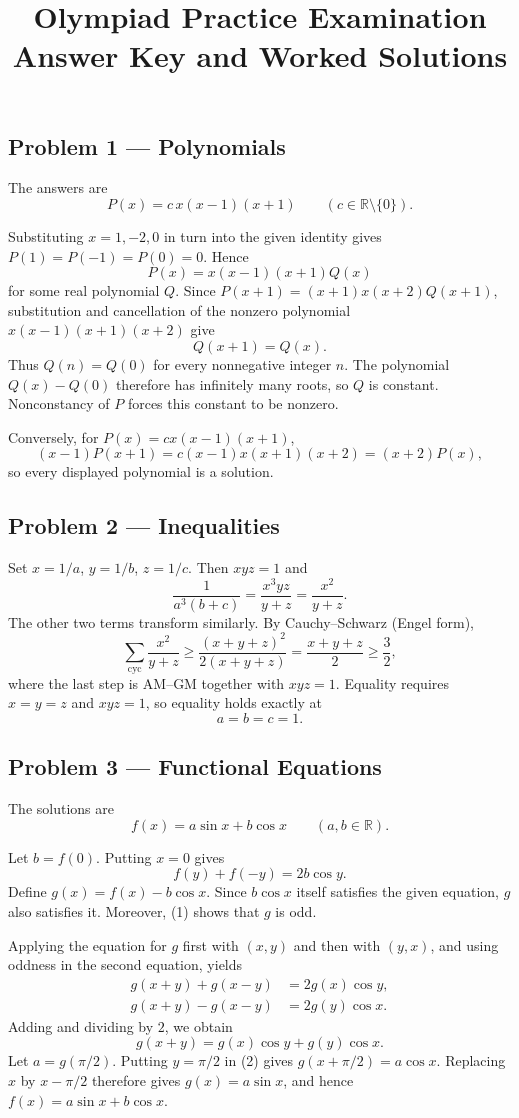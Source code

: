 \documentclass[11pt,a4paper]{article}
\title{\vspace{-1.5cm}\bfseries Olympiad Practice Examination\\Answer Key and Worked Solutions}
\author{}
\date{}
\newcommand{\RR}{\mathbb{R}}
\newcommand{\solution}[2]{\subsection*{Problem #1 --- #2}}
\begin{document}
\maketitle
\vspace{-2em}

\solution{1}{Polynomials}
The answers are
\[
  \boxed{P(x)=c\,x(x-1)(x+1)\qquad(c\in\RR\setminus\{0\}).}
\]

Substituting $x=1,-2,0$ in turn into the given identity gives
$P(1)=P(-1)=P(0)=0$. Hence
\[
  P(x)=x(x-1)(x+1)Q(x)
\]
for some real polynomial $Q$. Since
$P(x+1)=(x+1)x(x+2)Q(x+1)$, substitution and cancellation of the nonzero
polynomial $x(x-1)(x+1)(x+2)$ give
\[
  Q(x+1)=Q(x).
\]
Thus $Q(n)=Q(0)$ for every nonnegative integer $n$. The polynomial
$Q(x)-Q(0)$ therefore has infinitely many roots, so $Q$ is constant.
Nonconstancy of $P$ forces this constant to be nonzero.

Conversely, for $P(x)=c x(x-1)(x+1)$,
\[
  (x-1)P(x+1)=c(x-1)x(x+1)(x+2)=(x+2)P(x),
\]
so every displayed polynomial is a solution.

\solution{2}{Inequalities}
Set $x=1/a$, $y=1/b$, $z=1/c$. Then $xyz=1$ and
\[
  \frac1{a^3(b+c)}
  =\frac{x^3yz}{y+z}
  =\frac{x^2}{y+z}.
\]
The other two terms transform similarly. By Cauchy--Schwarz (Engel form),
\[
  \sum_{\mathrm{cyc}}\frac{x^2}{y+z}
  \ge \frac{(x+y+z)^2}{2(x+y+z)}
  =\frac{x+y+z}{2}
  \ge\frac32,
\]
where the last step is AM--GM together with $xyz=1$. Equality requires
$x=y=z$ and $xyz=1$, so equality holds exactly at
\[
  \boxed{a=b=c=1}.
\]

\solution{3}{Functional Equations}
The solutions are
\[
  \boxed{f(x)=a\sin x+b\cos x\qquad(a,b\in\RR).}
\]

Let $b=f(0)$. Putting $x=0$ gives
\[
  f(y)+f(-y)=2b\cos y. \tag{1}
\]
Define $g(x)=f(x)-b\cos x$. Since $b\cos x$ itself satisfies the given
equation, $g$ also satisfies it. Moreover, (1) shows that $g$ is odd.

Applying the equation for $g$ first with $(x,y)$ and then with $(y,x)$, and
using oddness in the second equation, yields
\begin{align*}
  g(x+y)+g(x-y)&=2g(x)\cos y,\\
  g(x+y)-g(x-y)&=2g(y)\cos x.
\end{align*}
Adding and dividing by $2$, we obtain
\[
  g(x+y)=g(x)\cos y+g(y)\cos x. \tag{2}
\]
Let $a=g(\pi/2)$. Putting $y=\pi/2$ in (2) gives
$g(x+\pi/2)=a\cos x$. Replacing $x$ by $x-\pi/2$ therefore gives
$g(x)=a\sin x$, and hence $f(x)=a\sin x+b\cos x$.
\end{document}
